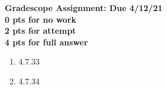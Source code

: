 \documentclass[a4paper,11pt]{article}
\begin{document}
\begin{center}
{\bf Gradescope Assignment: Due 4/12/21\\
0 pts for no work\\ 2 pts for attempt\\ 4 pts for full answer}
\end{center}
\begin{enumerate}
\item 4.7.33
\item 4.7.34
\end{enumerate}
\end{document}

